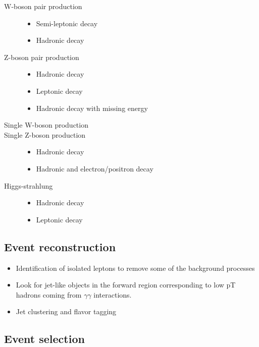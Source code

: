    \begin{description}
      \item[W-boson pair production]
      \begin{itemize}
        \item Semi-leptonic decay
        \item Hadronic decay
      \end{itemize}
      \item[Z-boson pair production]
      \begin{itemize}
        \item Hadronic decay
        \item Leptonic decay
        \item Hadronic decay with missing energy
      \end{itemize}
      \item[Single W-boson production]
      \item[Single Z-boson production]
      \begin{itemize}
        \item Hadronic decay
        \item Hadronic and electron/positron decay
      \end{itemize}
      \item[Higgs-strahlung]
      \begin{itemize}
        \item Hadronic decay
        \item Leptonic decay
      \end{itemize}
   \end{description}
 
  \subsection{Event reconstruction}

  \begin{itemize}
    \item Identification of isolated leptons to remove some of the background processes
    \item Look for jet-like objects in the forward region corresponding to low pT hadrons coming from $\gamma \gamma$ interactions.
    \item Jet clustering and flavor tagging
  \end{itemize}

  \subsection{Event selection}

